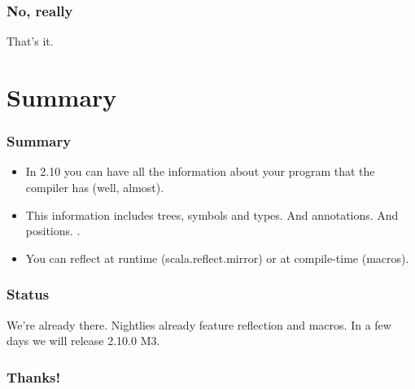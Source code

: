 \documentclass[hyperref={bookmarks=false}]{beamer}
\begin{document}
\begin{frame}[fragile]
\frametitle{No, really}

That's it.

\end{frame}

\section{Summary}

\begin{frame}[fragile]
\frametitle{Summary}

\begin{itemize}
\item In 2.10 you can have all the information about your program that the compiler has (well, almost).
\item This information includes trees, symbols and types. And annotations. And positions.
.
\item You can reflect at runtime (scala.reflect.mirror) or at compile-time (macros).
\end{itemize}
\end{frame}

\begin{frame}[fragile]
\frametitle{Status}

We're already there. Nightlies already feature reflection and macros.
In a few days we will release 2.10.0 M3.

\end{frame}


\begin{frame}[fragile]
\frametitle{Thanks!}

\centering
{}

\end{frame}
\end{document}
